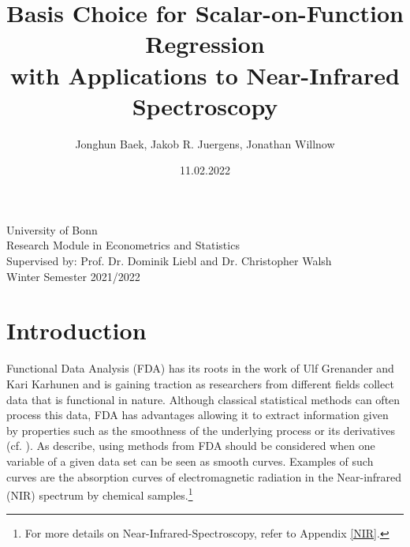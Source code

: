 \documentclass[11pt,twoside,a4paper]{article}
\begin{document}
\begin{titlepage}

	\title{{\LARGE Basis Choice for Scalar-on-Function Regression \\ with Applications to Near-Infrared Spectroscopy}}
	\author{Jonghun Baek, Jakob R. Juergens, Jonathan Willnow}
	\date{11.02.2022}
	\maketitle
	\thispagestyle{empty}
	\vspace{1.5 cm}
	\begin{center}
		University of Bonn \\
		\vspace{0.2cm}
		Research Module in Econometrics and Statistics \\
		Supervised by: Prof. Dr. Dominik Liebl and Dr. Christopher Walsh \\
		\vspace{0.2cm}
		Winter Semester 2021/2022
	\end{center}
\end{titlepage}
	\newpage
	
	\thispagestyle{empty}
	\tableofcontents
	
	\newpage
	
	\setlength{\abovedisplayskip}{0.35cm}
	\setlength{\belowdisplayskip}{0.35cm}

	\setlength{\abovedisplayshortskip}{0.2cm}
	\setlength{\belowdisplayshortskip}{0.35cm}

	\section{Introduction}
		
	Functional Data Analysis (FDA) has its roots in the work of Ulf Grenander and Kari Karhunen and is gaining traction as researchers from different fields collect data that is functional in nature. Although classical statistical methods can often process this data, FDA has advantages allowing it to extract information given by properties such as the smoothness of the underlying process or its derivatives (cf. \cite{levitin_introduction_2007}).	As \cite{kokoszka_introduction_2017} describe, using methods from FDA should be considered when one variable of a given data set can be seen as smooth curves.	 
	Examples of such curves are the absorption curves of electromagnetic radiation in the Near-infrared (NIR) spectrum by chemical samples.\footnote{For more details on Near-Infrared-Spectroscopy, refer to Appendix \ref{NIR}.}
	
\end{document}
